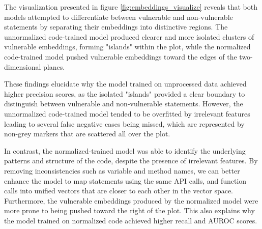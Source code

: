 \documentclass{ieeeaccess}
\begin{document}
\par  The visualization presented in figure \ref{fig:embeddings_visualize} reveals that both models attempted to differentiate between vulnerable and non-vulnerable statements by separating their embeddings into distinctive regions. The unnormalized code-trained model produced clearer and more isolated clusters of vulnerable embeddings, forming "islands" within the plot, while the normalized code-trained model pushed vulnerable embeddings toward the edges of the two-dimensional planes. 
\par These findings elucidate why the model trained on unprocessed data achieved higher precision scores, as the isolated "islands" provided a clear boundary to distinguish between vulnerable and non-vulnerable statements. However, the unnormalized code-trained model tended to be overfitted by irrelevant features leading to several false negative cases being missed, which are represented by non-grey markers that are scattered all over the plot. 
 \par In contrast, the normalized-trained model  was able to identify the underlying patterns and structure of the code, despite the presence of irrelevant features. By removing inconsistencies such as variable and method names,  we can better enhance the model to map statements using the same  API calls, and function calls  into unified vectors that are closer to each other in the vector space. Furthermore, the vulnerable embeddings produced by the normalized model were more prone to being pushed toward the right of the plot.   This also explains why the model trained on normalized code achieved higher recall  and AUROC scores. 
\end{document}
